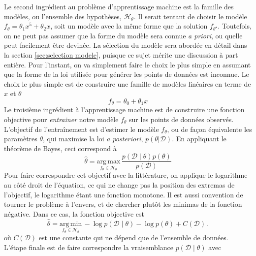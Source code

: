 Le second ingrédient au problème d'apprentissage machine est la famille des modèles, ou l'ensemble des hypothèses, $\mathcal{H}_\theta$. 
Il serait tentant de choisir le modèle $f_\theta = \theta_1 x^{5} + \theta_2 x$, soit un modèle avec la même forme que la solution 
$f_{\theta^{\star}}$. Toutefois, on ne peut pas assumer que la forme du modèle sera connue \textit{a priori}, 
ou quelle peut facilement être devinée. La sélection du modèle sera abordée en détail dans la section \ref{sec:selection modele}, 
puisque ce sujet mérite une discussion à part entière.
Pour l'instant, on va simplement faire le choix le plus simple en assumant que la forme de 
la loi utilisée pour générer les points de données est inconnue. 
Le choix le plus simple est de construire une famille de modèles linéaires en terme de $x$ et $\theta$
\begin{equation}\label{eq:modele lineaire}
        f_\theta = \theta_0 + \theta_1 x%
\end{equation} 
Le troisième ingrédient à l'apprentissage machine est de construire une fonction objective pour \textit{entrainer} notre modèle $f_\theta$ sur les points 
de données observés. 
L'objectif de l'entraînement est d'estimer le modèle $f_\theta$, ou de façon équivalente les paramètres $\theta$, qui maximise la loi \textit{a posteriori}, $p(\theta | \mathcal{D})$. En appliquant 
le théorème de Bayes, ceci correspond à
\begin{equation}
        \hat{\theta} = \underset{f_\theta \in \mathcal{H}_\theta}{\mathrm{arg\, max}}\, \frac{p(\mathcal{D} \mid \theta) p(\theta)}{p(\mathcal{D})}
\end{equation} 
Pour faire correspondre cet objectif avec la littérature, on applique le logarithme au côté droit de l'équation, ce qui ne change pas la position des extremas de 
l'objectif, le logarithme étant une fonction monotone. Il est aussi convention de tourner le problème à l'envers, et de chercher plutôt les minimas de la fonction négative. Dans 
ce cas, la fonction objective est
\begin{equation}
        \hat{\theta} = \underset{f_\theta \in \mathcal{H}_\theta}{\mathrm{arg\, min}}\, -\log p(\mathcal{D} \mid \theta) - \log p(\theta) + C(\mathcal{D})\, .
\end{equation} 
où $C(\mathcal{D})$ est une constante qui ne dépend que de l'ensemble de données. L'étape finale est de faire correspondre la vraisemblance $p(\mathcal{D} \mid \theta)$ avec 
